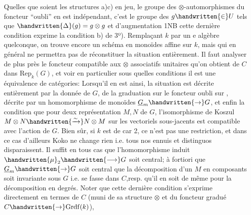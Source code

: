  Quelles que soient les structures a)c) en jeu, le groupe des $\otimes$-automorphismes du foncteur  ``oubli'' en est indépendant, c'est le groupe des $g\handwritten{\in}U$ tels que $\handwritten{\Delta}(g)=g\otimes g$ et d'augmentation 1\unsure{(}NB cette dernière condition exprime la condition b) de 3º). Remplaçant $k$ par un e algèbre quelconque, on trouve encore un  schéma en monoïdes affine sur $k$, mais qui en général ne permettra pas de réconstituer la situation entièrement.  Il faut analyser de plus près
le foncteur compatible aux $\otimes$ associatifs unitaires qu'on obtient de $C$ dans $\mathrm{Rep}_k(G)$, et voir en particulier sous quelles conditions il est une équivalence de catégories:  Lorsqu'il en est ainsi, la situation est décrite entièrement par la donnée de $G$, de la graduation sur  le foncteur oubli sur , décrite par un homomorphisme de monoïdes $\underline{G}_m\handwritten{\to}G$, et enfin la condition que pour deux représentation $M,N$ de $G$, l'isomorphisme de Koszul $M\otimes N\handwritten{\xrightarrow{\sim}}N\otimes M$ sur les vectoriels sous-jacents est compatible avec l'action de $G$. Bien sûr, si $k$ est de car 2, ce n'est pas une restriction, et dans ce cas d'ailleurs Koko ne change rien i.e. tous nos ennuis et distinguos disparaissent.  Il suffit en tous cas que l'homomorphisme induit $\handwritten{\mu}_2\handwritten{\longrightarrow}G$ soit central; à fortiori que $\underline{G}_m\handwritten{\to}G$ soit central que la décomposition d'un $M$ en composants  soit invariante sous $G$ i.e. se fasse dans $C$,resp. qu'il en soit de même pour la décomposition en degrés. Noter que cette dernière condition s'exprime directement en termes de $C$ (muni de sa structure $\otimes$ et du foncteur  gradué $C\handwritten{\to}\mathrm{Grdf}(k)$), 

